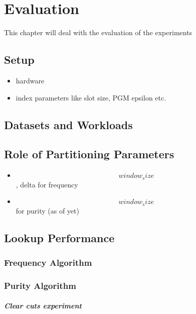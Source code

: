 \thispagestyle{plain}
\chapter{Evaluation}

This chapter will deal with the evaluation of the experiments

\section{Setup}
\begin{itemize}
    \item hardware
    \item index parameters like slot size, PGM epsilon etc.
\end{itemize}

\section{Datasets and Workloads}

\section{Role of Partitioning Parameters}
\begin{itemize}
    \item $$window_size$$, delta for frequency
    \item $$window_size$$ for purity (as of yet)
\end{itemize}

\section{Lookup Performance}

\subsection{Frequency Algorithm}

\subsection{Purity Algorithm}

\paragraph{Clear cuts experiment}

